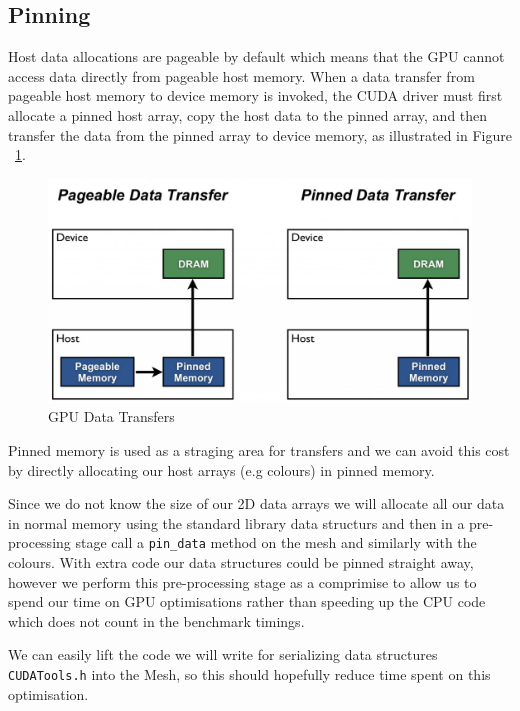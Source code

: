 \subsection*{Pinning}
Host data allocations are pageable by default which means that the GPU cannot access data directly from pageable host memory. When a data transfer from pageable host memory to device memory is invoked, the CUDA driver must first allocate a pinned host array, copy the host data to the pinned array, and then transfer the data from the pinned array to device memory\cite{transfer}, as illustrated in Figure ~\ref{fig:pinning}.
\begin{figure}[H]
  \centering
  \includegraphics[scale=0.3]{images/pinning}
  \caption[pinning]{GPU Data Transfers\cite{transfer}}
  \label{fig:pinning}
\end{figure}
Pinned memory is used as a straging area for transfers and we can avoid this cost by directly allocating our host arrays (e.g colours) in pinned memory.

Since we do not know the size of our 2D data arrays we will allocate all our data in normal memory using the standard library data structurs and then in a pre-processing stage call a \verb!pin_data! method on the mesh and similarly with the colours.
With extra code our data structures could be pinned straight away, however we perform this pre-processing stage as a comprimise to allow us to spend our time on GPU optimisations rather than speeding up the CPU code which does not count in the benchmark timings.

We can easily lift the code we will write for serializing data structures \verb!CUDATools.h! into the Mesh, so this should hopefully reduce time spent on this optimisation.